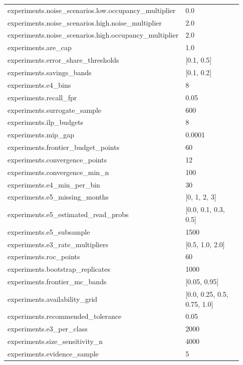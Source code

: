 \begin{longtable}{p{0.55\linewidth}p{0.38\linewidth}}
experiments.noise\_scenarios.low.occupancy\_multiplier & 0.0 \\
experiments.noise\_scenarios.high.noise\_multiplier & 2.0 \\
experiments.noise\_scenarios.high.occupancy\_multiplier & 2.0 \\
experiments.are\_cap & 1.0 \\
experiments.error\_share\_thresholds & [0.1, 0.5] \\
experiments.savings\_bands & [0.1, 0.2] \\
experiments.e4\_bins & 8 \\
experiments.recall\_fpr & 0.05 \\
experiments.surrogate\_sample & 600 \\
experiments.ilp\_budgets & 8 \\
experiments.mip\_gap & 0.0001 \\
experiments.frontier\_budget\_points & 60 \\
experiments.convergence\_points & 12 \\
experiments.convergence\_min\_n & 100 \\
experiments.e4\_min\_per\_bin & 30 \\
experiments.e5\_missing\_months & [0, 1, 2, 3] \\
experiments.e5\_estimated\_read\_probs & [0.0, 0.1, 0.3, 0.5] \\
experiments.e5\_subsample & 1500 \\
experiments.e3\_rate\_multipliers & [0.5, 1.0, 2.0] \\
experiments.roc\_points & 60 \\
experiments.bootstrap\_replicates & 1000 \\
experiments.frontier\_mc\_bands & [0.05, 0.95] \\
experiments.availability\_grid & [0.0, 0.25, 0.5, 0.75, 1.0] \\
experiments.recommended\_tolerance & 0.05 \\
experiments.e3\_per\_class & 2000 \\
experiments.size\_sensitivity\_n & 4000 \\
experiments.evidence\_sample & 5 \\
\hline
\end{longtable}
